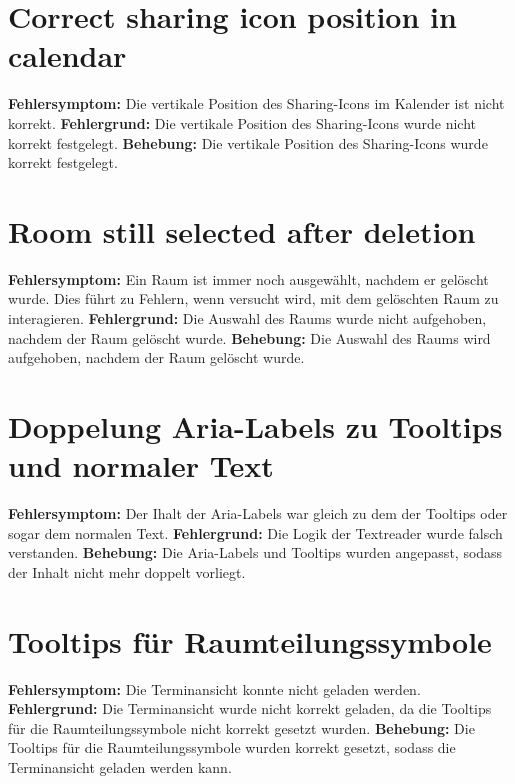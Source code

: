 \section{Correct sharing icon position in calendar}
\textbf{Fehlersymptom:} Die vertikale Position des Sharing-Icons im Kalender ist nicht korrekt.
\textbf{Fehlergrund:} Die vertikale Position des Sharing-Icons wurde nicht korrekt festgelegt.
\textbf{Behebung:} Die vertikale Position des Sharing-Icons wurde korrekt festgelegt.

\section{Room still selected after deletion}
\textbf{Fehlersymptom:} Ein Raum ist immer noch ausgewählt, nachdem er gelöscht wurde. Dies führt zu Fehlern, wenn versucht wird, mit dem gelöschten Raum zu interagieren.
\textbf{Fehlergrund:} Die Auswahl des Raums wurde nicht aufgehoben, nachdem der Raum gelöscht wurde.
\textbf{Behebung:} Die Auswahl des Raums wird aufgehoben, nachdem der Raum gelöscht wurde.

\section{Doppelung Aria-Labels zu Tooltips und normaler Text}
\textbf{Fehlersymptom:} Der Ihalt der Aria-Labels war gleich zu dem der Tooltips oder sogar dem normalen Text.
\textbf{Fehlergrund:} Die Logik der Textreader wurde falsch verstanden.
\textbf{Behebung:} Die Aria-Labels und Tooltips wurden angepasst, sodass der Inhalt nicht mehr doppelt vorliegt.

\section{Tooltips für Raumteilungssymbole}
\textbf{Fehlersymptom: } Die Terminansicht konnte nicht geladen werden.
\textbf{Fehlergrund: } Die Terminansicht wurde nicht korrekt geladen, da die Tooltips für die Raumteilungssymbole nicht korrekt gesetzt wurden.
\textbf{Behebung: } Die Tooltips für die Raumteilungssymbole wurden korrekt gesetzt, sodass die Terminansicht geladen werden kann.

